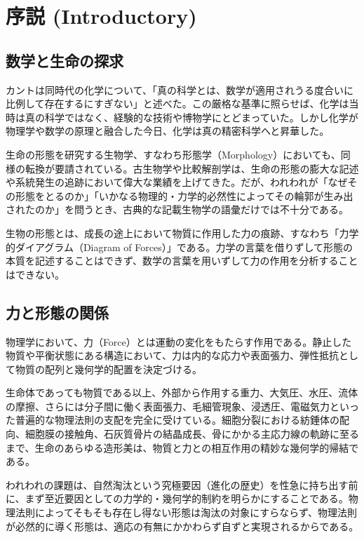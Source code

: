 \chapter{序説 (Introductory)}

\section{数学と生命の探求}

カントは同時代の化学について、「真の科学とは、数学が適用されうる度合いに比例して存在するにすぎない」と述べた。この厳格な基準に照らせば、化学は当時は真の科学ではなく、経験的な技術や博物学にとどまっていた。しかし化学が物理学や数学の原理と融合した今日、化学は真の精密科学へと昇華した。

生命の形態を研究する生物学、すなわち形態学（Morphology）においても、同様の転換が要請されている。古生物学や比較解剖学は、生命の形態の膨大な記述や系統発生の追跡において偉大な業績を上げてきた。だが、われわれが「なぜその形態をとるのか」「いかなる物理的・力学的必然性によってその輪郭が生み出されたのか」を問うとき、古典的な記載生物学の語彙だけでは不十分である。

生物の形態とは、成長の途上において物質に作用した力の痕跡、すなわち「力学的ダイアグラム（Diagram of Forces）」である。力学の言葉を借りずして形態の本質を記述することはできず、数学の言葉を用いずして力の作用を分析することはできない。

\section{力と形態の関係}

物理学において、力（Force）とは運動の変化をもたらす作用である。静止した物質や平衡状態にある構造において、力は内的な応力や表面張力、弾性抵抗として物質の配列と幾何学的配置を決定づける。

生命体であっても物質である以上、外部から作用する重力、大気圧、水圧、流体の摩擦、さらには分子間に働く表面張力、毛細管現象、浸透圧、電磁気力といった普遍的な物理法則の支配を完全に受けている。細胞分裂における紡錘体の配向、細胞膜の接触角、石灰質骨片の結晶成長、骨にかかる主応力線の軌跡に至るまで、生命のあらゆる造形美は、物質と力との相互作用の精妙な幾何学的帰結である。

われわれの課題は、自然淘汰という究極要因（進化の歴史）を性急に持ち出す前に、まず至近要因としての力学的・幾何学的制約を明らかにすることである。物理法則によってそもそも存在し得ない形態は淘汰の対象にすらならず、物理法則が必然的に導く形態は、適応の有無にかかわらず自ずと実現されるからである。

